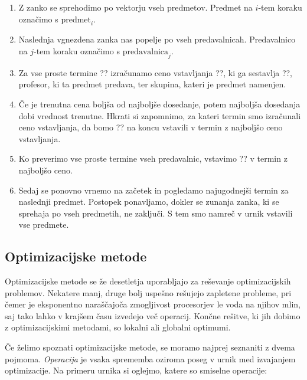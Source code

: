 \documentclass[a4paper,10pt]{article}
\begin{document}
\begin{enumerate}
   
      \item Z zanko se sprehodimo po vektorju vseh predmetov. Predmet na $i$-tem koraku
      označimo s $\text{predmet}_i$.
   
      \item Naslednja vgnezdena zanka nas popelje po vseh predavalnicah. Predavalnico na
      $j$-tem koraku označimo s $\text{predavalnica}_j$.
   
      \item Za vse proste termine ?? izračunamo ceno vstavljanja
      ??, ki ga sestavlja ??, profesor, ki ta predmet predava,
      ter skupina, kateri je predmet namenjen.
   
      \item Če je trenutna cena boljša od najboljše dosedanje, potem najboljša dosedanja
      dobi vrednost trenutne. Hkrati si zapomnimo, za kateri termin smo izračunali ceno
      vstavljanja, da bomo ?? na koncu vstavili v termin z najboljšo
      ceno vstavljanja.
   
      \item Ko preverimo vse proste termine vseh predavalnic, vstavimo ??
      v termin z najboljšo ceno.
   
      \item Sedaj se ponovno vrnemo na začetek in pogledamo najugodnejši termin za naslednji
      predmet. Postopek ponavljamo, dokler se zunanja zanka, ki se sprehaja po vseh predmetih,
      ne zaključi. S tem smo namreč v urnik vstavili vse predmete.
   
\end{enumerate}
\subsection{Optimizacijske metode}

Optimizacijske metode se že desetletja uporabljajo za reševanje optimizacijskih problemov.
Nekatere manj, druge bolj uspešno rešujejo zapletene probleme, pri čemer je eksponentno
naraščajoča zmogljivost procesorjev le voda na njihov mlin, saj tako lahko v krajšem
času izvedejo več operacij. Končne rešitve, ki jih dobimo z optimizacijskimi metodami,
so lokalni ali globalni optimumi.

Če želimo spoznati optimizacijske metode, se moramo najprej seznaniti z dvema pojmoma.
\emph{Operacija} je vsaka sprememba oziroma poseg v urnik med izvajanjem optimizacije.
Na primeru urnika si oglejmo, katere so smiselne operacije:
\end{document}
